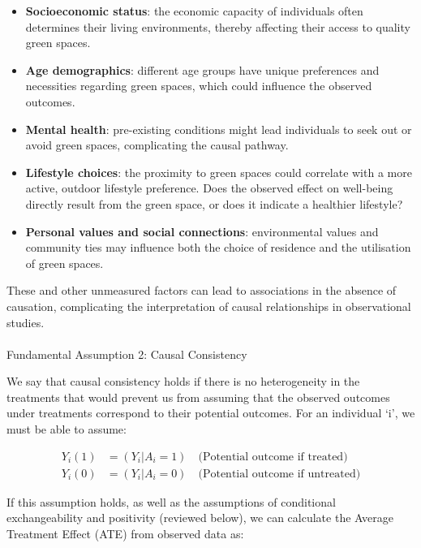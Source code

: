 \documentclass[
  singlecolumn]{article}
\makeatletter
\let\oldparagraph\paragraph
\renewcommand{\paragraph}{
    \@ifstar
      \xxxParagraphStar
      \xxxParagraphNoStar
  }
\newcommand{\xxxParagraphStar}[1]{\oldparagraph*{#1}\mbox{}}
\newcommand{\xxxParagraphNoStar}[1]{\oldparagraph{#1}\mbox{}}
\providecommand{\tightlist}{%
  \setlength{\itemsep}{0pt}\setlength{\parskip}{0pt}}\usepackage{longtable,booktabs,array}
\makeatother
\begin{document}
\begin{itemize}
\tightlist
\item
  \textbf{Socioeconomic status}: the economic capacity of individuals
  often determines their living environments, thereby affecting their
  access to quality green spaces.
\item
  \textbf{Age demographics}: different age groups have unique
  preferences and necessities regarding green spaces, which could
  influence the observed outcomes.
\item
  \textbf{Mental health}: pre-existing conditions might lead individuals
  to seek out or avoid green spaces, complicating the causal pathway.
\item
  \textbf{Lifestyle choices}: the proximity to green spaces could
  correlate with a more active, outdoor lifestyle preference. Does the
  observed effect on well-being directly result from the green space, or
  does it indicate a healthier lifestyle?
\item
  \textbf{Personal values and social connections}: environmental values
  and community ties may influence both the choice of residence and the
  utilisation of green spaces.
\end{itemize}

These and other unmeasured factors can lead to associations in the
absence of causation, complicating the interpretation of causal
relationships in observational studies.

\paragraph{Fundamental Assumption 2: Causal
Consistency}\label{fundamental-assumption-2-causal-consistency}

We say that causal consistency holds if there is no heterogeneity in the
treatments that would prevent us from assuming that the observed
outcomes under treatments correspond to their potential outcomes. For an
individual `i', we must be able to assume:

\[
\begin{aligned}
Y_{i}(1) &= (Y_{i}|A_{i} = 1) \quad \text{(Potential outcome if treated)} \\
Y_{i}(0) &= (Y_{i}|A_{i} = 0) \quad \text{(Potential outcome if untreated)}
\end{aligned}
\]

If this assumption holds, as well as the assumptions of conditional
exchangeability and positivity (reviewed below), we can calculate the
Average Treatment Effect (ATE) from observed data as:
\end{document}
